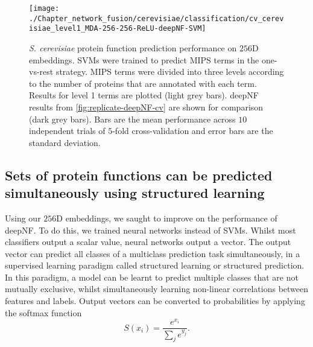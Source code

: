 \begin{figure}[!hbt]
    \centering
    \texttt{[image: ./Chapter\_network\_fusion/cerevisiae/classification/cv\_cerevisiae\_level1\_MDA-256-256-ReLU-deepNF-SVM]}
    \caption{%
        \emph{S. cerevisiae} protein function prediction performance on $256$D embeddings.
        SVMs were trained to predict MIPS terms in the one-vs-rest strategy.
        MIPS terms were divided into three levels according to the number of proteins that are annotated with each term.
        Results for level 1 terms are plotted (light grey bars).
        deepNF results from \ref{fig:replicate-deepNF-cv} are shown for comparison (dark grey bars).
        Bars are the mean performance across $10$ independent trials of $5$-fold cross-validation and error bars are the standard deviation.
    }
    \label{fig:256D-embeddings-SVM-cv}
\end{figure}

\subsection{Sets of protein functions can be predicted simultaneously using structured learning}
\label{structured-prediction-of-mips-annotations}

Using our $256$D embeddings, we saught to improve on the performance of deepNF.
To do this, we trained neural networks instead of SVMs.
Whilst most classifiers output a scalar value, neural networks output a vector.
The output vector can predict all classes of a multiclass prediction task simultaneously, in a supervised learning paradigm called structured learning or structured prediction.
In this paradigm, a model can be learnt to predict multiple classes that are not mutually exclusive, whilst simultaneously learning non-linear correlations between features and labels.
Output vectors can be converted to probabilities by applying the softmax function
\[
S(x_i) = \frac{e^{x_i}}{\sum_j e^{y_j}}.
\]


